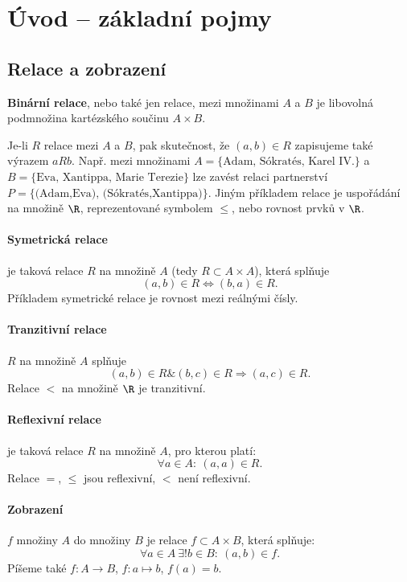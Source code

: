 \section{Úvod -- základní pojmy}




\subsection{Relace a zobrazení}

\begin{df} {\bf Binární relace}, nebo také jen relace, mezi množinami $A$ a $B$ je libovolná podmnožina kartézského součinu $A\times B$.
\end{df}
Je-li $R$ relace mezi $A$ a $B$, pak skutečnost, že $(a,b)\in R$ zapisujeme také výrazem $aRb$.
Např. mezi množinami $A=\{\mbox{Adam, Sókratés, Karel IV.}\}$ a $B=\{\mbox{Eva, Xantippa, Marie Terezie}\}$ lze zavést relaci partnerství $P=\{\mbox{(Adam,Eva), (Sókratés,Xantippa)}\}$.
Jiným příkladem relace je uspořádání na množině $\R$, reprezentované symbolem $\le$, nebo rovnost prvků v $\R$.

\paragraph{Symetrická relace} je taková relace $R$ na množině $A$ (tedy $R\subset A\times A$), která splňuje
$$ (a,b)\in R\Leftrightarrow(b,a)\in R. $$
Příkladem symetrické relace je rovnost mezi reálnými čísly.

\paragraph{Tranzitivní relace} $R$ na množině $A$ splňuje
$$ (a,b)\in R \& (b,c)\in R\Rightarrow (a,c)\in R. $$
Relace $<$ na množině $\R$ je tranzitivní.

\paragraph{Reflexivní relace} je taková relace $R$ na množině $A$, pro kterou platí:
$$ \forall a\in A:~(a,a)\in R. $$
Relace $=$, $\le$ jsou reflexivní, $<$ není reflexivní.


\paragraph{Zobrazení} $f$ množiny $A$ do množiny $B$ je relace $f\subset A\times B$, která splňuje:
$$ \forall a\in A~\exists!b\in B:~(a,b)\in f. $$
Píšeme také $f:A\to B$, $f:a\mapsto b$, $f(a)=b$.

